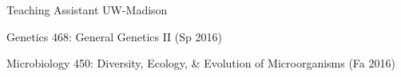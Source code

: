 

\begin{cventries}

  \cventry
    {Teaching Assistant} %
    {UW-Madison} %
    {} %
    {} %
    {
      \begin{cvitems} %
        \item {Genetics 468: General Genetics II (Sp 2016)}
        \item {Microbiology 450: Diversity, Ecology, \& Evolution of Microorganisms (Fa 2016)}
      \end{cvitems}
    }
    
\end{cventries}